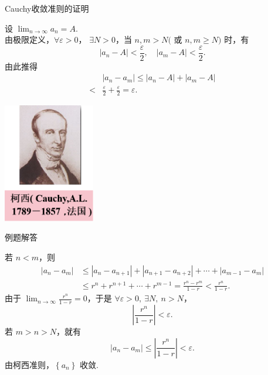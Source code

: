 \documentclass[mathserif]{beamer}
\begin{document}
\begin{frame}[label=Cauchyzm]{Cauchy收敛准则的证明 \hfill\hyperlink{Cauchyzz<1>}{}}%
	\begin{multicols}{2}
		\suojin \zheng 设 $\lim _{n \rightarrow \infty} a_n=A$.\\
		\suojin 由极限定义，$\forall \varepsilon>0$， $\exists N>0$，当 $n, m>N($ 或 $n, m \geq N)$ 时，有
		$$
		\left|a_n-A\right|<\frac{\varepsilon}{2},\quad \left|a_m-A\right|<\frac{\varepsilon}{2} . 
		$$
		由此推得
		$$
		\begin{aligned}
			&\left|a_n-a_m\right| \leqslant\left|a_n-A\right|+\left|a_m-A\right|\\
			<&\frac{\varepsilon}{2}+\frac{\varepsilon}{2}=\varepsilon .
		\end{aligned}
		$$  
		\begin{center}
			\vspace{-0.85\baselineskip}
			\includegraphics[width=0.3\textwidth]{figures/cauchy.png}
			\vspace{-0.85\baselineskip}
		\end{center}
	\end{multicols}
\end{frame}






\begin{frame}[label=li_bc4jd]{例题解答\hfill\hyperlink{li_bc2<1>}{}}%
	\begin{proofs}
		\suojin  若 $n<m$，则
		$$
		\begin{aligned}
			\left|a_n-a_m\right| & \leq\left|a_n-a_{n+1}\right|+\left|a_{n+1}-a_{n+2}\right|+\cdots+\left|a_{m-1}-a_m\right| \\
			& \leq r^n+r^{n+1}+\cdots+r^{m-1}=\frac{r^n-r^m}{1-r}<\frac{r^n}{1-r} .
		\end{aligned}
		$$
		\suojin 由于 $\lim _{n \rightarrow \infty} \frac{r^n}{1-r}=0$，于是 $\forall \varepsilon>0,\  \exists N,\  n>N$，
		$$
		\left|\frac{r^n}{1-r}\right|<\varepsilon.
		$$   
		若 $m>n>N$，就有
		$$
		\left|a_{n}-a_m\right| \leq\left|\frac{r^n}{1 - r}\right|<\varepsilon .
		$$
		由柯西准则，$\left\{a_n\right\}$ 收敛.
	\end{proofs}
\end{frame}
\end{document}

